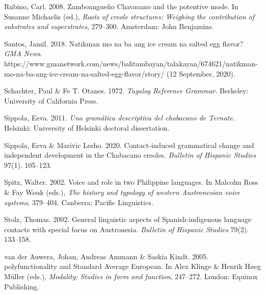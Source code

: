 \begin{styleBibliography}
Rubino, Carl. 2008. Zamboangueño Chavacano and the potentive mode. In Susanne Michaelis (ed.), \textit{Roots of creole structures: Weighing the contribution of substrates and superstrates}, 279–300. Amsterdam: John Benjamins.
\end{styleBibliography}

\begin{styleBibliography}
Santos, Jamil. 2018. Natikman mo na ba ang ice cream na salted egg flavor? \textit{GMA News}. https://www.gmanetwork.com/news/balitambayan/talakayan/674621/natikman-mo-na-ba-ang-ice-cream-na-salted-egg-flavor/story/ (12 September, 2020).
\end{styleBibliography}

\begin{styleBibliography}
Schachter, Paul \& Fe T. Otanes. 1972. \textit{Tagalog Reference Grammar}. Berkeley: University of California Press.
\end{styleBibliography}

\begin{styleBibliography}
Sippola, Eeva. 2011. \textit{Una gramática descriptiva del chabacano de Ternate}. Helsinki: University of Helsinki doctoral dissertation.
\end{styleBibliography}

\begin{styleBibliography}
Sippola, Eeva \& Marivic Lesho. 2020. Contact-induced grammatical change and independent development in the Chabacano creoles. \textit{Bulletin of Hispanic Studies} 97(1). 105–123.
\end{styleBibliography}

\begin{styleBibliography}
Spitz, Walter. 2002. Voice and role in two Philippine languages. In Malcolm Ross \& Fay Wouk (eds.), \textit{The history and typology of western Austronesian voice systems}, 379–404. Canberra: Pacific Linguistics.
\end{styleBibliography}

\begin{styleBibliography}
Stolz, Thomas. 2002. General linguistic aspects of Spanish-indigenous language contacts with special focus on Austronesia. \textit{Bulletin of Hispanic Studies} 79(2). 133–158.
\end{styleBibliography}

\begin{styleBibliography}
van der Auwera, Johan, Andreas Ammann \& Saskia Kindt. 2005. polyfunctionality and Standard Average European. In Alex Klinge \& Henrik Høeg Müller (eds.), \textit{Modality: Studies in form and function}, 247–272. London: Equinox Publishing.
\end{styleBibliography}

